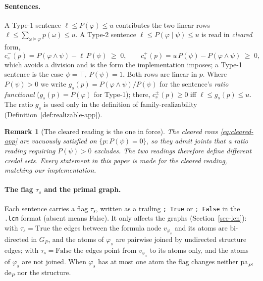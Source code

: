 \documentclass{article} %
\DeclareRobustCommand{\rev}[1]{{\color{blue}#1}}
\newtheorem{remark}{Remark}
\newcommand{\pa}{\mathrm{pa}}
\begin{document}
\paragraph{Sentences.}
A Type-1 sentence $\ell\le P(\varphi)\le u$ contributes the two linear rows
$\ell\le\sum_{\omega\models\varphi}p(\omega)\le u$. A Type-2 sentence
$\ell\le P(\varphi\mid\psi)\le u$ is read in \emph{cleared} form,
\begin{equation}\label{eq:cleared-app}
  c_s^-(p)=P(\varphi\wedge\psi)-\ell\,P(\psi)\;\ge\;0,\qquad
  c_s^+(p)=u\,P(\psi)-P(\varphi\wedge\psi)\;\ge\;0,
\end{equation}
which avoids a division and is the form the implementation imposes; a Type-1
sentence is the case $\psi=\top$, $P(\psi)=1$. Both rows are linear in $p$.
Where $P(\psi)>0$ we write $g_s(p)=P(\varphi\wedge\psi)/P(\psi)$ for the
sentence's \emph{ratio functional} ($g_s(p)=P(\varphi)$ for Type-1); there,
$c^\pm_s(p)\ge0$ iff $\ell\le g_s(p)\le u$. The ratio $g_s$ is used only in the
definition of family-realizability (Definition~\ref{def:realizable-app}).

\begin{remark}[The cleared reading is the one in force]\label{rem:cleared}
The cleared rows \eqref{eq:cleared-app} are vacuously satisfied on
$\{p:P(\psi)=0\}$, so they admit joints that a ratio reading requiring
$P(\psi)>0$ excludes. The two readings therefore define different credal sets.
Every statement in this paper is made for the cleared reading, matching our
implementation.
\end{remark}

\paragraph{The flag $\tau_s$ and the primal graph.}
Each sentence carries a flag $\tau_s$, written as a trailing \texttt{; True} or
\texttt{; False} in the \texttt{.lcn} format (absent means False). It only
affects the graphs (Section~\ref{sec-lcn}): with $\tau_s=\mathrm{True}$ the edges
between the formula node \rev{$v_{\varphi_s}$} and its atoms are bi-directed in $G_P$, and
the atoms of $\varphi_s$ are pairwise joined by undirected structure edges; with
$\tau_s=\mathrm{False}$ the edges point from \rev{$v_{\varphi_s}$} to its atoms only, and
the atoms of $\varphi_s$ are not joined. When $\varphi_s$ has at most one atom the
flag changes neither $\pa_P$, $\mathrm{de}_P$ nor the structure.
\end{document}
